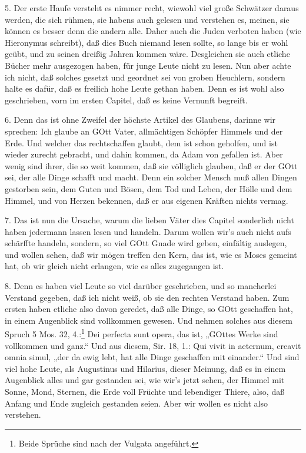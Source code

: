 5. Der erste Haufe versteht es nimmer recht, wiewohl viel große Schwätzer daraus werden, die sich rühmen, sie habens auch gelesen und verstehen es, meinen, sie können es besser denn die andern alle. Daher auch die Juden verboten haben (wie Hieronymus schreibt), daß dies Buch niemand lesen sollte, so lange bis er wohl geübt, und zu seinen dreißig Jahren kommen wäre. Desgleichen sie auch etliche Bücher mehr ausgezogen haben, für junge Leute nicht zu lesen. Nun aber achte ich nicht, daß solches gesetzt und geordnet sei von groben Heuchlern, sondern halte es dafür, daß es freilich hohe Leute gethan haben. Denn es ist wohl also geschrieben, vorn im ersten Capitel, daß es keine Vernunft begreift.

6. Denn das ist ohne Zweifel der höchste Artikel des Glaubens, darinne wir sprechen: Ich
glaube an GOtt Vater, allmächtigen Schöpfer Himmels und der Erde. Und welcher das rechtschaffen glaubt, dem ist schon geholfen, und ist wieder zurecht gebracht, und dahin kommen, da Adam von gefallen ist. Aber wenig sind ihrer, die so weit kommen, daß sie völliglich glauben, daß er der GOtt sei, der alle Dinge schafft und macht. Denn ein solcher Mensch muß allen Dingen gestorben sein, dem Guten und Bösen, dem Tod und Leben, der Hölle und dem Himmel, und von Herzen bekennen, daß er aus eigenen Kräften nichts vermag.

7. Das ist nun die Ursache, warum die lieben Väter dies Capitel sonderlich nicht haben jedermann lassen lesen und handeln. Darum wollen wir’s auch nicht aufs schärffte handeln, sondern, so viel GOtt Gnade wird geben, einfältig auslegen, und wollen sehen, daß wir mögen treffen den Kern, das ist, wie es Moses gemeint hat, ob wir gleich nicht erlangen, wie es alles zugegangen ist.

8. Denn es haben viel Leute so viel darüber geschrieben, und so mancherlei Verstand gegeben, daß ich nicht weiß, ob sie den rechten Verstand haben. Zum ersten haben etliche also davon geredet, daß alle Dinge, so GOtt geschaffen hat, in einem Augenblick sind vollkommen gewesen. Und nehmen solches aus diesem Spruch 5 Mos. 32, 4.:\footnote{Beide Sprüche sind nach der Vulgata angeführt.} Dei perfecta sunt opera, das ist, „GOttes Werke sind vollkommen und ganz.“ Und aus diesem, Sir. 18, 1.: Qui vivit in aeternum, creavit omnia simul, „der da ewig lebt, hat alle Dinge geschaffen mit einander.“ Und sind viel hohe Leute, als Augustinus und Hilarius, dieser Meinung, daß es in einem Augenblick alles und gar gestanden sei, wie wir’s jetzt sehen, der Himmel mit Sonne, Mond, Sternen, die Erde voll Früchte und lebendiger Thiere, also, daß Anfang und Ende zugleich gestanden seien. Aber wir wollen es nicht also verstehen.

